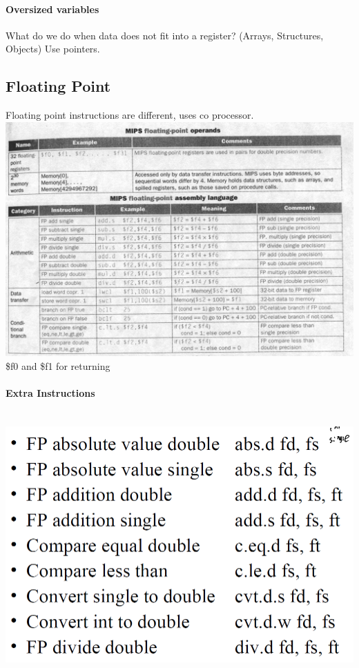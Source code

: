 \documentclass[12 pt]{article}
\begin{document}
\paragraph{Oversized variables}
What do we do when data does not fit into a register? (Arrays, Structures, Objects) Use pointers.
\subsection{Floating Point}
Floating point instructions are different, uses co processor.
\\ \includegraphics[scale=0.3]{fpi}
\\ \$f0 and \$f1 for returning
\paragraph{Extra Instructions} ~\\ \includegraphics[scale=0.7]{fpii}
\end{document}
